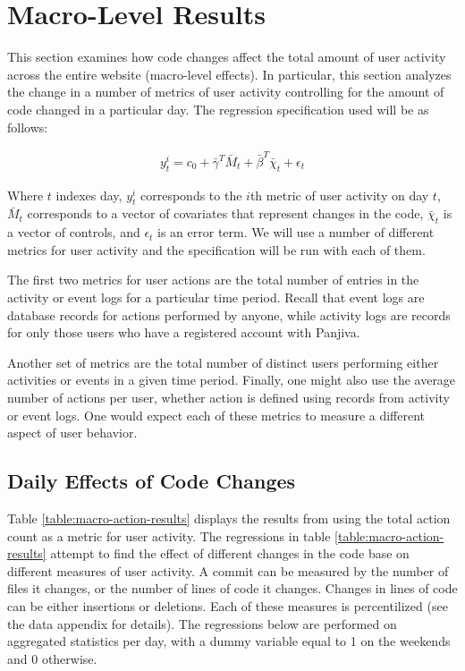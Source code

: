 \documentclass[12pt]{article}
\begin{document}
\section{Macro-Level Results}

This section examines how code changes affect the total amount of user activity across the entire website (macro-level effects). In particular, this section analyzes the change in a number of metrics of user activity controlling for the amount of code changed in a particular day. The regression specification used will be as follows:

\begin{eqnarray}
y^i_{t} = c_0 + \bar{\gamma}^T \bar{M}_t + \bar{\beta}^T \bar{\chi}_t + \epsilon_t
\end{eqnarray}

Where $t$ indexes day, $y^i_t$ corresponds to the $i$th metric of user activity on day $t$, $\bar{M}_t$ corresponds to a vector of covariates that represent changes in the code, $\bar{\chi}_t$ is a vector of controls, and $\epsilon_t$ is an error term. We will use a number of different metrics for user activity and the specification will be run with each of them. 

The first two metrics for user actions are the total number of entries in the activity or event logs for a particular time period. Recall that event logs are database records for actions performed by anyone, while activity logs are records for only those users who have a registered account with Panjiva.

Another set of metrics are the total number of distinct users performing either activities or events in a given time period. Finally, one might also use the average number of actions per user, whether action is defined using records from activity or event logs. One would expect each of these metrics to measure a different aspect of user behavior. 

\subsection{Daily Effects of Code Changes}

Table \ref{table:macro-action-results} displays the results from using the total action count as a metric for user activity. The regressions in table \ref{table:macro-action-results} attempt to find the effect of different changes in the code base on different measures of user activity. A commit can be measured by the number of files it changes, or the number of lines of code it changes. Changes in lines of code can be either insertions or deletions. Each of these measures is percentilized (see the data appendix for details). The regressions below are performed on aggregated statistics per day, with a dummy variable equal to 1 on the weekends and 0 otherwise.  
\end{document}
